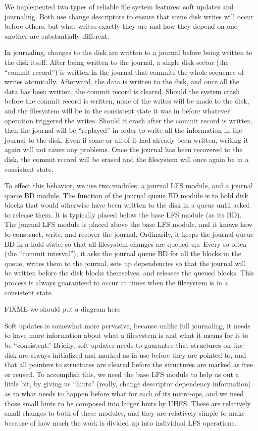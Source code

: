 We implemented two types of reliable file system features: soft updates and
journaling. Both use change descriptors to ensure that some disk writes will
occur before others, but what writes exactly they are and how they depend on one
another are substantially different.

In journaling, changes to the disk are written to a journal before being
written to the disk itself. After being written to the journal, a single disk
sector (the ``commit record'') is written in the journal that commits the whole
sequence of writes atomically. Afterward, the data is written to the disk, and
once all the data has been written, the commit record is cleared. Should the
system crash before the commit record is written, none of the writes will be
made to the disk, and the filesystem will be in the consistent state it was in
before whatever operation triggered the writes. Should it crash after the commit
record is written, then the journal will be ``replayed'' in order to write all
the information in the journal to the disk. Even if some or all of it had
already been written, writing it again will not cause any problems. Once the
journal has been recovered to the disk, the commit record will be erased and the
filesystem will once again be in a consistent state.

To effect this behavior, we use two modules: a journal LFS module, and a journal
queue BD module. The function of the journal queue BD module is to hold disk
blocks that would otherwise have been written to the disk in a queue until asked
to release them. It is typically placed below the base LFS module (as its BD).
The journal LFS module is placed above the base LFS module, and it knows how to
construct, write, and recover the journal. Ordinarily, it keeps the journal
queue BD in a hold state, so that all filesystem changes are queued up. Every so
often (the ``commit interval''), it asks the journal queue BD for all the blocks
in the queue, writes them to the journal, sets up dependencies so that the
journal will be written before the disk blocks themselves, and releases the
queued blocks. This process is always guaranteed to occur at times when the
filesystem is in a consistent state.

FIXME we should put a diagram here

Soft updates is somewhat more pervasive, because unlike full journaling, it
needs to have more information about what a filesystem is and what it means for
it to be ``consistent.'' Briefly, soft updates needs to guarantee that
structures on the disk are always initialized and marked as in use before they
are pointed to, and that all pointers to structures are cleared before the
structures are marked as free or reused. To accomplish this, we need the base
LFS module to help us out a little bit, by giving us ``hints'' (really, change
descriptor dependency information) as to what needs to happen before what for
each of its micro-ops, and we need those small hints to be composed into larger
hints by UHFS. These are relatively small changes to both of these modules, and
they are relatively simple to make because of how much the work is divided up
into individual LFS operations.

